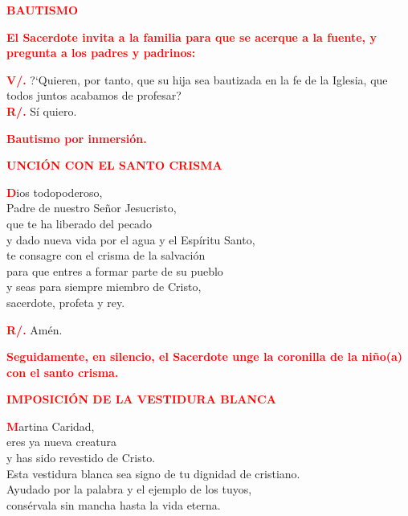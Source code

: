 \documentclass[12pt, letterpaper]{report}
\begin{document}
\Large {\bfseries \textcolor{red}{BAUTISMO}} \newline

\large {\bfseries \textcolor{red}{El Sacerdote invita a la familia para que se acerque a la fuente, y pregunta a los padres y padrinos:}} \newline

\noindent
\Large {\bfseries \textcolor{red}{V/.}} \hspace{0.5cm} ?`Quieren, por tanto, que su hija sea bautizada en la fe de la Iglesia, que todos juntos acabamos de profesar? \\
\Large {\bfseries \textcolor{red}{R/.}} \hspace{0.5cm} S\'i quiero. \newline

\large {\bfseries \textcolor{red}{Bautismo por inmersi\'on.}} \newline

\Large {\bfseries \textcolor{red}{UNCI\'ON CON EL SANTO CRISMA}}

\lettrine[lines=1]{\bfseries \textcolor{red}{D}}{}\Large ios todopoderoso, \\
Padre de nuestro Se\~nor Jesucristo, \\
que te ha liberado del pecado \\
y dado nueva vida por el agua y el Esp\'iritu Santo, \\
te consagre con el crisma de la salvaci\'on \\
para que entres a formar parte de su pueblo \\
y seas para siempre miembro de Cristo, \\
sacerdote, profeta y rey. \newline

\noindent
\Large {\bfseries \textcolor{red}{R/.}} \hspace{0.5cm} Am\'en. \newline

\large {\bfseries \textcolor{red}{Seguidamente, en silencio, el Sacerdote unge la coronilla de la ni\~no(a) con el santo crisma.}} \newline

\Large {\bfseries \textcolor{red}{IMPOSICI\'ON DE LA VESTIDURA BLANCA}}

\lettrine[lines=1]{\bfseries \textcolor{red}{M}}{}\Large artina Caridad, \\ 
eres ya nueva creatura \\
y has sido revestido de Cristo. \\
Esta vestidura blanca sea signo de tu dignidad de cristiano. \\
Ayudado por la palabra y el ejemplo de los tuyos, \\
cons\'ervala sin mancha hasta la vida eterna. \newline
\end{document}

